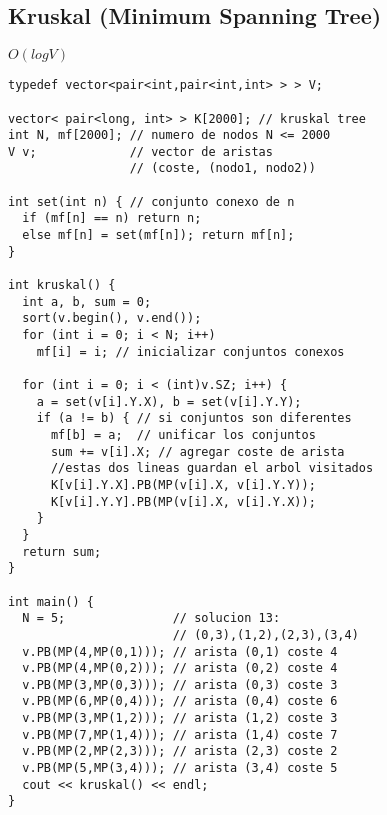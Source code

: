 \documentclass[10pt, a4, oneside]{article}
\begin{document}
\subsection{Kruskal (Minimum Spanning Tree)}
$O(log V)$
\begin{verbatim}
typedef vector<pair<int,pair<int,int> > > V;

vector< pair<long, int> > K[2000]; // kruskal tree
int N, mf[2000]; // numero de nodos N <= 2000
V v;             // vector de aristas
                 // (coste, (nodo1, nodo2))

int set(int n) { // conjunto conexo de n
  if (mf[n] == n) return n;
  else mf[n] = set(mf[n]); return mf[n];
}

int kruskal() {
  int a, b, sum = 0;
  sort(v.begin(), v.end());
  for (int i = 0; i < N; i++)
    mf[i] = i; // inicializar conjuntos conexos

  for (int i = 0; i < (int)v.SZ; i++) {
    a = set(v[i].Y.X), b = set(v[i].Y.Y);
    if (a != b) { // si conjuntos son diferentes
      mf[b] = a;  // unificar los conjuntos
      sum += v[i].X; // agregar coste de arista
      //estas dos lineas guardan el arbol visitados
      K[v[i].Y.X].PB(MP(v[i].X, v[i].Y.Y));
      K[v[i].Y.Y].PB(MP(v[i].X, v[i].Y.X));
    }
  }
  return sum;
}

int main() {
  N = 5;               // solucion 13:
                       // (0,3),(1,2),(2,3),(3,4)
  v.PB(MP(4,MP(0,1))); // arista (0,1) coste 4
  v.PB(MP(4,MP(0,2))); // arista (0,2) coste 4
  v.PB(MP(3,MP(0,3))); // arista (0,3) coste 3
  v.PB(MP(6,MP(0,4))); // arista (0,4) coste 6
  v.PB(MP(3,MP(1,2))); // arista (1,2) coste 3
  v.PB(MP(7,MP(1,4))); // arista (1,4) coste 7
  v.PB(MP(2,MP(2,3))); // arista (2,3) coste 2
  v.PB(MP(5,MP(3,4))); // arista (3,4) coste 5
  cout << kruskal() << endl;
}
\end{verbatim}
\end{document}
